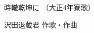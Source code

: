 \documentclass[10pt,b5j]{tarticle} %
\begin{document}
\begin{minipage}[c]{0.7\hsize} %
    \begin{center}
        {\LARGE
            時轍乾坤に %
        }
        {\small 
            （大正4年寮歌） %
        }
    \end{center}
\end{minipage}
\begin{minipage}[c]{0.3\hsize} %
    \begin{flushright} %
        沢田退蔵君 作歌・作曲 %
    \end{flushright}
\end{minipage}
\end{document}
